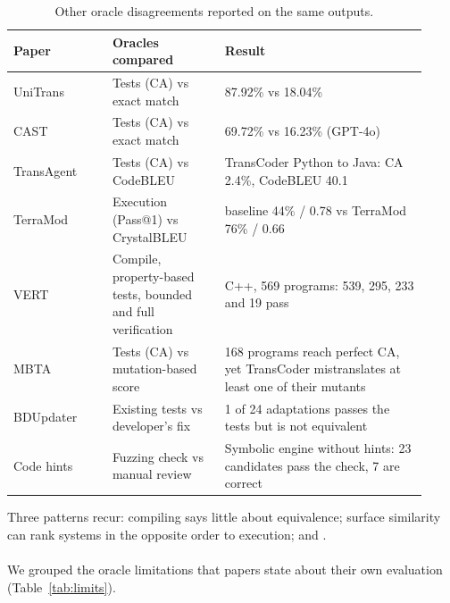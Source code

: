 \begin{table}[t]
  \centering
  \caption{Other oracle disagreements reported on the same outputs.}
  \label{tab:disagree}
  \small
  \begin{tabular}{@{}P{0.22\linewidth} P{0.25\linewidth} P{0.45\linewidth}@{}}
    \toprule
    Paper & Oracles compared & Result \\
    \midrule
    UniTrans~\cite{unitrans} & Tests (CA) vs exact match & 87.92\% vs 18.04\%  \\
    CAST~\cite{cast} & Tests (CA) vs exact match & 69.72\% vs 16.23\% (GPT-4o) \\
    TransAgent~\cite{transagent} & Tests (CA) vs CodeBLEU & TransCoder Python to Java: CA 2.4\%, CodeBLEU 40.1 \\
    TerraMod~\cite{terramod} & Execution (Pass@1) vs CrystalBLEU &  baseline 44\% / 0.78 vs TerraMod 76\% / 0.66 \\
    VERT~\cite{vert} & Compile, property-based tests, bounded and full verification & C++, 569 programs: 539, 295, 233 and 19 pass \\
    MBTA~\cite{mbta} & Tests (CA) vs mutation-based score & 168 programs reach perfect CA, yet TransCoder mistranslates at least one of their mutants \\
    BDUpdater~\cite{bdupdater} & Existing tests vs developer's fix & 1 of 24 adaptations passes the tests but is not equivalent \\
    Code hints~\cite{codehints} & Fuzzing check vs manual review & Symbolic engine without hints: 23 candidates pass the check, 7 are correct \\
    \bottomrule
  \end{tabular}
\end{table}

Three patterns recur: compiling says little about equivalence; surface similarity can rank systems in the opposite order to execution; and .

\paragraph{} We grouped the oracle limitations that papers state about their own evaluation (Table~\ref{tab:limits}).

